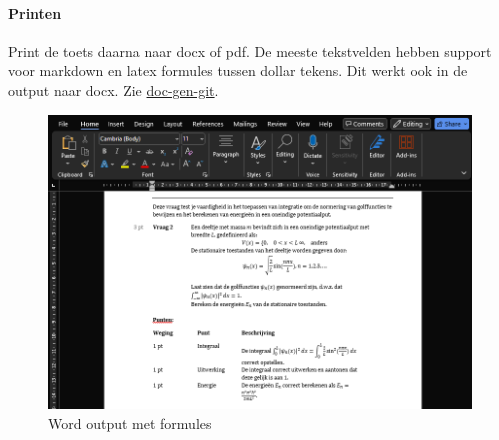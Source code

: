 \documentclass[12pt]{article}
\begin{document}
\paragraph{Printen} Print de toets daarna naar docx of pdf. De meeste tekstvelden hebben support voor markdown en latex formules tussen dollar tekens. Dit werkt ook in de output naar docx. Zie \href{https://github.com/TanteJossa/PWS-inscannen/tree/main/flask_apps/doc_gen}{doc-gen-git}.
\begin{figure}[H]
    \centering
    \includegraphics[width=\linewidth]{./images/demo/generation/word.png}
    \caption{Word output met formules}
    \label{fig:word-gen}
\end{figure}
\end{document}
